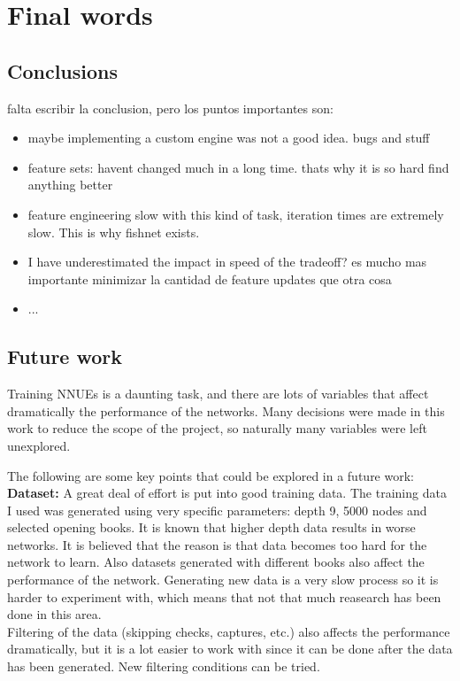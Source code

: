 \section{Final words}
\subsection{Conclusions}

falta escribir la conclusion, pero los puntos importantes son:

\begin{itemize}
\item maybe implementing a custom engine was not a good idea. bugs and stuff
\item feature sets: havent changed much in a long time. thats why it is so hard find anything better
\item feature engineering slow with this kind of task, iteration times are extremely slow. This is why fishnet exists.
\item I have underestimated the impact in speed of the tradeoff? es mucho mas importante minimizar la cantidad de feature updates que otra cosa
\item ...
\end{itemize}


\subsection{Future work}

Training NNUEs is a daunting task, and there are lots of variables that affect dramatically the performance of the networks. Many decisions were made in this work to reduce the scope of the project, so naturally many variables were left unexplored.

The following are some key points that could be explored in a future work: \\

\textbf{Dataset:} A great deal of effort is put into good training data. The training data I used was generated using very specific parameters: depth 9, 5000 nodes and selected opening books. It is known that higher depth data results in worse networks. It is believed that the reason is that data becomes too hard for the network to learn. Also datasets generated with different books also affect the performance of the network.  Generating new data is a very slow process so it is harder to experiment with, which means that not that much reasearch has been done in this area. \\
Filtering of the data (skipping checks, captures, etc.) also affects the performance dramatically, but it is a lot easier to work with since it can be done after the data has been generated. New filtering conditions can be tried. \\

